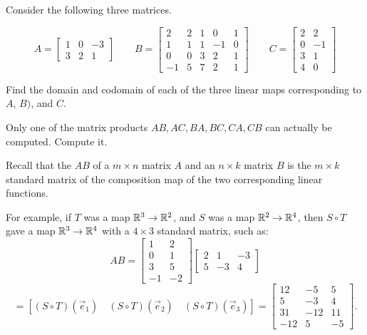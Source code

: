 \begin{activity}{10}
Consider the following three matrices.

\[
  A = \begin{bmatrix}1&0&-3\\3&2&1\end{bmatrix}
    \hspace{2em}
  B = \begin{bmatrix}2&2&1&0&1\\1&1&1&-1&0\\0&0&3&2&1\\-1&5&7&2&1\end{bmatrix}
    \hspace{2em}
  C = \begin{bmatrix}2&2\\0&-1\\3&1\\4&0\end{bmatrix}
\]

\begin{subactivity}
Find the domain and codomain of each of the three linear maps corresponding to \(A\), \(B)\), and \(C\).
\end{subactivity}
\begin{subactivity} 
Only one of the matrix products
\(AB,AC,BA,BC,CA,CB\) can actually be computed.
Compute it.
\end{subactivity}
\end{activity}



\begin{remark}
Recall that the  \(AB\) of a 
\(m \times n\) matrix \(A\) and an \(n \times k\)
matrix \(B\) is the \(m \times k\) 
standard matrix of the composition map of the
two corresponding linear functions.

\vspace{1em}

For example, if  \(T\) was a map \(\mathbb{R}^3 \rightarrow \mathbb{R}^2\), and 
\(S\) was a map \(\mathbb{R}^2 \rightarrow \mathbb{R}^4\), then \(S \circ T\) gave a map \(\mathbb{R}^3 \rightarrow \mathbb{R}^4\) with a
\(4\times 3\) standard matrix, such as:
\[
  AB
    =
  \begin{bmatrix} 1 & 2 \\ 0 & 1 \\ 3 & 5 \\ -1 & -2 \end{bmatrix}
  \begin{bmatrix} 2 & 1 & -3 \\ 5 & -3 & 4 \end{bmatrix}
\]
\[
    =
  \left[
  (S \circ T)(\vec{e}_1) \hspace{1em}
  (S\circ T)(\vec{e}_2) \hspace{1em}
  (S \circ T)(\vec{e}_3)
  \right]
    =
  \begin{bmatrix}
    12 & -5 & 5 \\
    5 & -3 & 4 \\
    31 & -12 & 11 \\
    -12 & 5 & -5
  \end{bmatrix}
.\]
\end{remark}






